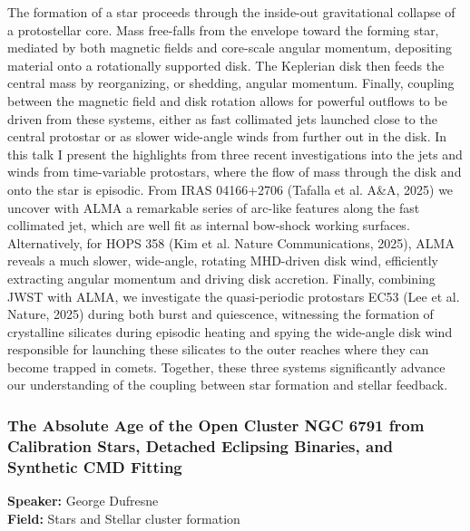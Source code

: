 The formation of a star proceeds through the inside-out gravitational collapse of a protostellar core. Mass free-falls from the envelope toward the forming star, mediated by both magnetic fields and core-scale angular momentum, depositing material onto a rotationally supported disk. The Keplerian disk then feeds the central mass by reorganizing, or shedding, angular momentum. Finally, coupling between the magnetic field and disk rotation allows for powerful outflows to be driven from these systems, either as fast collimated jets launched close to the central protostar or as slower wide-angle winds from further out in the disk. In this talk I present the highlights from three recent investigations into the jets and winds from time-variable protostars, where the flow of mass through the disk and onto the star is episodic. From IRAS 04166+2706 (Tafalla et al. A\&A, 2025) we uncover with ALMA a remarkable series of arc-like features along the fast collimated jet, which are well fit as internal bow-shock working surfaces. Alternatively, for HOPS 358 (Kim et al. Nature Communications, 2025), ALMA reveals a much slower, wide-angle, rotating MHD-driven disk wind, efficiently extracting angular momentum and driving disk accretion. Finally, combining JWST with ALMA, we investigate the quasi-periodic protostars EC53 (Lee et al. Nature, 2025) during both burst and quiescence, witnessing the formation of crystalline silicates during episodic heating and spying the wide-angle disk wind responsible for launching these silicates to the outer reaches where they can become trapped in comets. Together, these three systems significantly advance our understanding of the coupling between star formation and stellar feedback.

\hypertarget{abstract-talk-70}{}\label{abstract-page-talk-70}
\subsubsection*{The Absolute Age of the Open Cluster NGC 6791 from Calibration Stars, Detached Eclipsing Binaries, and Synthetic CMD Fitting}
\textbf{Speaker:} George Dufresne\\
\textbf{Field:} Stars and Stellar cluster formation

